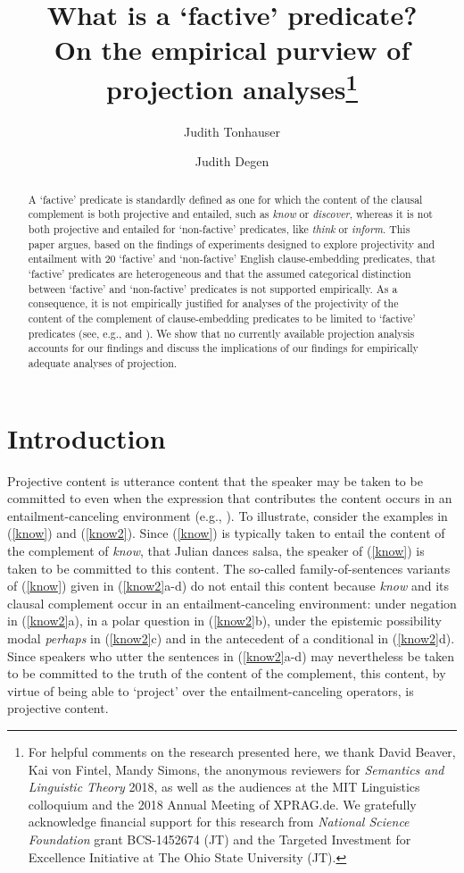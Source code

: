 \documentclass[11pt,fleqn]{article}
\title{What is a `factive' predicate? \\ On the empirical purview of projection analyses\thanks{For helpful comments on the research presented here, we thank David Beaver, Kai von Fintel, Mandy Simons, the anonymous reviewers for {\em Semantics and Linguistic Theory} 2018, as well as the audiences at the MIT Linguistics colloquium and the 2018 Annual Meeting of XPRAG.de. We gratefully acknowledge financial support for this research from {\em National Science Foundation} grant BCS-1452674 (JT) and the Targeted Investment for Excellence Initiative at The Ohio State University (JT).}}
\author[$\circ$]{Judith Tonhauser}
\author[$\bullet$]{Judith Degen}
\affil[$\circ$]{The Ohio State University / University of Stuttgart}
\affil[$\bullet$]{Stanford University}
\newcommand{\6}{\mbox{$[\hspace*{-.6mm}[$}}
\newcommand{\9}{\mbox{$]\hspace*{-.6mm}]$}}
\begin{document}

\maketitle


\begin{abstract}

A `factive' predicate is standardly defined as one for which the content of the clausal complement is both projective and entailed, such as {\em know} or {\em discover}, whereas it is not both projective and entailed for `non-factive' predicates, like {\em think} or {\em inform}. This paper argues, based on the findings of experiments designed to explore projectivity and entailment with 20 `factive' and `non-factive' English clause-embedding predicates, that `factive' predicates are heterogeneous and that the assumed categorical distinction between `factive' and `non-factive' predicates is not supported empirically. As a consequence, it is not empirically justified for analyses of the projectivity of the content of the complement of clause-embedding predicates to be limited to `factive' predicates (see, e.g., \citealt{heim83,vds92,abrusan2011,abrusan2016,romoli2015} and \citealt{best-question}). We show that no currently available projection analysis accounts for our findings and discuss the implications of our findings for empirically adequate analyses of projection.

\end{abstract}
			
\section{Introduction}\label{s1}

Projective content is utterance content that the speaker may be taken to be committed to even when the expression that contributes the content occurs in an entailment-canceling environment (e.g., \citealt{brst-salt10,brst-lang11,tbd-variability}). To illustrate, consider the examples in (\ref{know}) and (\ref{know2}). Since (\ref{know}) is typically taken to entail the content of the complement of {\em know}, that Julian dances salsa, the speaker of (\ref{know}) is taken to be committed to this content. The so-called family-of-sentences variants of (\ref{know}) given in (\ref{know2}a-d) do not entail this content because {\em know} and its clausal complement occur in an entailment-canceling environment: under negation in (\ref{know2}a), in a polar question in (\ref{know2}b), under the epistemic possibility modal {\em perhaps} in (\ref{know2}c) and in the antecedent of a conditional in (\ref{know2}d). Since speakers who utter the sentences in (\ref{know2}a-d) may nevertheless be taken to be committed to the truth of the content of the complement, this content, by virtue of being able to `project' over the entailment-canceling operators, is projective content. 
\end{document}
